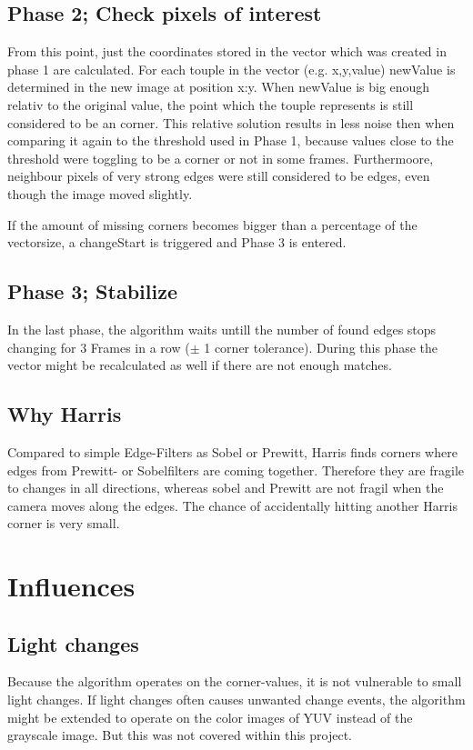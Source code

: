 \subsection{Phase 2; Check pixels of interest}
From this point, just the coordinates stored in the vector which was created in phase 1 are calculated.  For each touple in the vector (e.g. x,y,value) newValue is determined in the new image at position x:y. When newValue is big enough relativ to the original value, the point which the touple represents is still considered to be an corner. This relative solution results in less noise then when comparing it again to the threshold used in Phase 1, because values close to the threshold were toggling to be a corner or not in some frames. Furthermoore, neighbour pixels of very strong edges were still considered to be edges, even though the image moved slightly. 

If the amount of missing corners becomes bigger than a percentage of the vectorsize, a changeStart is triggered and Phase 3 is entered.

\subsection{Phase 3;  Stabilize}
In the last phase, the algorithm waits untill the number of found edges stops changing for 3 Frames in a row ($\pm$ 1 corner tolerance). During this phase the vector might be recalculated as well if there are not enough matches.

\subsection{Why Harris}
Compared to simple Edge-Filters as Sobel or Prewitt, Harris finds corners where edges from Prewitt- or Sobelfilters are coming together. Therefore they are fragile to changes in all directions, whereas sobel and Prewitt are not fragil when the camera moves along the edges. The chance of accidentally hitting another Harris corner is very small.



\section{Influences}
\subsection{Light changes}
Because the algorithm operates on the corner-values, it is not vulnerable to small light changes. If light changes often causes unwanted change events, the algorithm might be extended to operate on the color images of YUV instead of the grayscale image. But this was not covered within this project.

